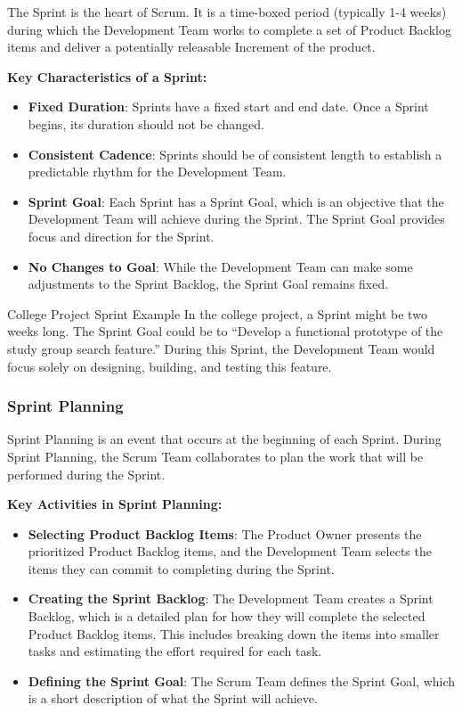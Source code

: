 The Sprint is the heart of Scrum. It is a time-boxed period (typically 1-4
weeks) during which the Development Team works to complete a set of Product
Backlog items and deliver a potentially releasable Increment of the product.

\textbf{Key Characteristics of a Sprint:}

\begin{itemize}
  \item \textbf{Fixed Duration}: Sprints have a fixed start and end date. Once a Sprint begins, its duration should not be changed.
  \item \textbf{Consistent Cadence}: Sprints should be of consistent length to establish a predictable rhythm for the Development Team.
  \item \textbf{Sprint Goal}: Each Sprint has a Sprint Goal, which is an objective that the Development Team will achieve during the Sprint. The Sprint Goal provides focus and direction for the Sprint.
  \item \textbf{No Changes to Goal}: While the Development Team can make some adjustments to the Sprint Backlog, the Sprint Goal remains fixed.
\end{itemize}

\begin{examplecard}{College Project Sprint Example}
  In the college project, a Sprint might be two weeks long. The Sprint Goal could be to ``Develop a functional prototype of the study group search feature.'' During this Sprint, the Development Team would focus solely on designing, building, and testing this feature.
\end{examplecard}

\subsubsection{Sprint Planning}

Sprint Planning is an event that occurs at the beginning of each Sprint. During
Sprint Planning, the Scrum Team collaborates to plan the work that will be
performed during the Sprint.

\textbf{Key Activities in Sprint Planning:}

\begin{itemize}
  \item \textbf{Selecting Product Backlog Items}: The Product Owner presents the prioritized Product Backlog items, and the Development Team selects the items they can commit to completing during the Sprint.
  \item \textbf{Creating the Sprint Backlog}: The Development Team creates a Sprint Backlog, which is a detailed plan for how they will complete the selected Product Backlog items. This includes breaking down the items into smaller tasks and estimating the effort required for each task.
  \item \textbf{Defining the Sprint Goal}: The Scrum Team defines the Sprint Goal, which is a short description of what the Sprint will achieve.
\end{itemize}

